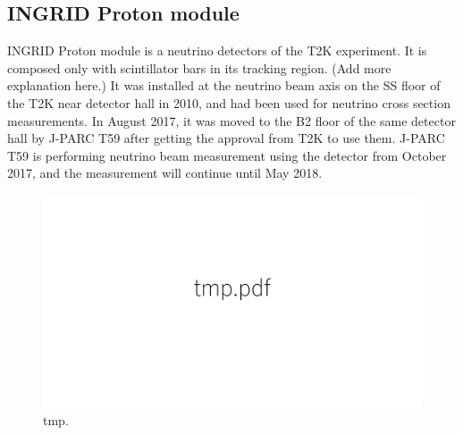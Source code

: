 \subsection{INGRID Proton module}
INGRID Proton module is a neutrino detectors of the T2K experiment.
It is composed only with scintillator bars in its tracking region. 
(Add more explanation here.)
It was installed at the neutrino beam axis on the SS floor of the T2K near detector hall in 2010, and had been used for neutrino cross section measurements.
In August 2017, it was moved to the B2 floor of the same detector hall by J-PARC T59 after getting the approval from T2K to use them.
J-PARC T59 is performing neutrino beam measurement using the detector from October 2017, and the measurement  will continue until May 2018.



\begin{figure}[tbh]
\begin{center}
\includegraphics[width=0.6\linewidth]{fig/tmp.pdf}
\end{center}
\caption{
tmp.
}
\label{fig:3dgrid}
\end{figure}

